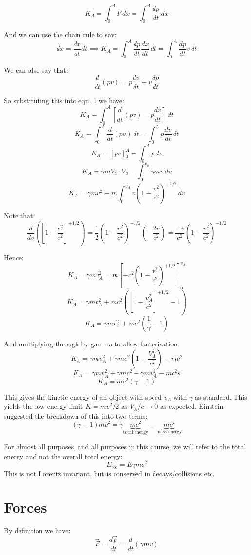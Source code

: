 \[
    K_A = \int_{0}^{A} F \, dx = \int_{0}^{A} \frac{dp}{dt} \, dx
\]

And we can use the chain rule to say:
\[
    dx = \frac{dx}{dt} dt \implies K_A = \int_{0}^{A} \frac{dp}{dt} \frac{dx}{dt} \, dt = \int_{0}^{A} \frac{dp}{dt} v \, dt \tag{1}
\]

We can also say that:
\[
    \frac{d}{dt} \left(pv\right) = p \frac{dv}{dt} + v \frac{dp}{dt}
\]

So substituting this into eqn. 1 we have:
\[
    K_A = \int_{0}^{A} \left[\frac{d}{dt} (pv) - p \frac{dv}{dt}\right] \, dt
\]
\[
    K_A = \int_{0}^{A} \frac{d}{dt} \left(pv\right) \, dt - \int_{0}^{A} p \frac{dv}{dt} \, dt
\]
\[
    K_A = \left[pv\right]_0^A - \int_{0}^{A} p \, dv
\]
\[
    K_A = \gamma m V_a \cdot V_a - \int_{0}^{v_a} \gamma m v \, dv
\]
\[
    K_A = \gamma mv^2 - m \int_{0}^{v_A} v \left(1 - \frac{v^2}{c^2}\right)^{-1/2} \, dv
\]

Note that:
\[
    \frac{d}{dv} \left(\left[1 - \frac{v^2}{c^2}\right]^{+1/2}\right) = \frac{1}{2} \left(1 - \frac{v^2}{c^2}\right)^{-1/2} \left(- \frac{2v}{c^2}\right) = \frac{-v}{c^2} \left(1 - \frac{v^2}{c^2}\right)^{-1/2}
\]

Hence:
\[
    K_A = \gamma m v_A^2 = m \left[-c^2 \left(1 - \frac{v^2}{c^2}\right)^{+1/2}\right]_0^{v_A}
\]
\[
    K_A = \gamma mv_A^2 + m c^2 \left(\left[1 - \frac{v_A^2}{c^2}\right]^{+1/2} - 1\right)
\]
\[
    K_A = \gamma mv_A^2 + mc^2 \left(\frac{1}{\gamma} - 1\right)
\]

And multiplying through by gamma to allow factorisation:
\[
    K_A = \gamma mv_A^2 + \gamma mc^2 \left(1 - \frac{V_A^2}{c^2}\right) - mc^2
\]
\[
    K_A = \gamma mv_A^2 + \gamma mc^2 - \gamma mv_A^2 - mc^2s
\]
\[
    \boxed{K_A = mc^2 \left(\gamma - 1\right)}
\]

This gives the kinetic energy of an object with speed $v_A$ with $\gamma$ as standard. This yields the low energy limit $K = mv^2 / 2$ as $V_A / c \to 0$ as expected. Einstein suggested the breakdown of this into two terms:
\[
    (\gamma - 1) mc^2 = \gamma \underbrace{mc^2}_\text{total energy} - \underbrace{mc^2}_\text{mass energy}
\]

For almost all purposes, and all purposes in this course, we will refer to the total energy and not the overall total energy:
\[
    E_\text{tot} = E \gamma m c^2
\]
This is not Lorentz invariant, but is conserved in decays/collisions etc.

\section{Forces}
By definition we have:
\[
    \vec{F} = \frac{d \vec{p}}{dt} = \frac{d}{dt} \left(\gamma m v\right)
\]

